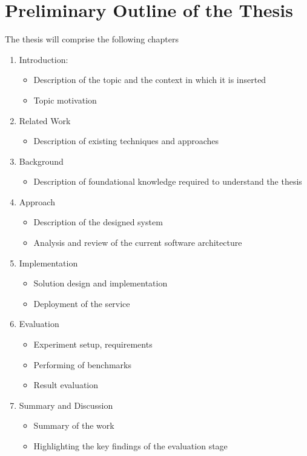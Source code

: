 \chapter{Preliminary Outline of the Thesis}
\label{ch:outline}

The thesis will comprise the following chapters
\begin{enumerate}
	\item Introduction:
		\begin{itemize}
			\item Description of the topic and the context in which it is inserted
			\item Topic motivation
		\end{itemize}
	
	\item Related Work
	\begin{itemize}
		\item Description of existing techniques and approaches
	\end{itemize}
	
	\item Background
	\begin{itemize}
		\item Description of foundational knowledge required to understand the thesis
	\end{itemize}
	
	\item Approach
	\begin{itemize}
		\item Description of the designed system
		\item Analysis and review of the current software architecture
	\end{itemize}
	
	\item Implementation
	\begin{itemize}
		\item Solution design and implementation
		\item Deployment of the service
	\end{itemize}
	
	\item Evaluation
	\begin{itemize}
		\item Experiment setup, requirements
		\item Performing of benchmarks
		\item Result evaluation
	\end{itemize}
	
	\item Summary and Discussion
	\begin{itemize}
		\item Summary of the work
		\item Highlighting the key findings of the evaluation stage
	\end{itemize}
\end{enumerate}
